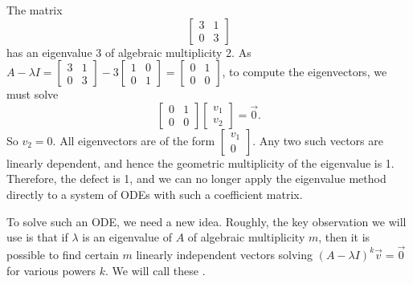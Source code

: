 \begin{example}
The matrix
\begin{equation*}
\begin{bmatrix}
3 & 1 \\ 0 & 3
\end{bmatrix}
\end{equation*}
has an eigenvalue 3 of algebraic multiplicity 2.
As 
$A-\lambda I = \left[ \begin{smallmatrix} 3 & 1 \\ 0 & 3 \end{smallmatrix} \right]
- 3
\left[ \begin{smallmatrix} 1 & 0 \\ 0 & 1 \end{smallmatrix} \right]
=
\left[ \begin{smallmatrix} 0 & 1 \\ 0 & 0 \end{smallmatrix} \right]
$, to compute the eigenvectors, we must solve
\begin{equation*}
\begin{bmatrix}
0 & 1 \\ 0 & 0
\end{bmatrix}
\begin{bmatrix}
v_1 \\ v_2
\end{bmatrix}
= \vec{0} .
\end{equation*}
So $v_2 = 0$.  All eigenvectors are of the form
$\left[ \begin{smallmatrix} v_1 \\ 0 \end{smallmatrix} \right]$.  Any two
such vectors are linearly dependent, and hence the geometric multiplicity
of the eigenvalue is 1.  Therefore, the defect is 1, and we can no longer
apply the eigenvalue method directly to a system of ODEs with such a
coefficient matrix.

\medskip

To solve such an ODE\@, we need a new idea.
Roughly, the key observation we will use is that
if $\lambda$ is an eigenvalue of $A$ of algebraic multiplicity $m$,
then it is possible to find certain $m$ linearly independent vectors
solving ${(A-\lambda I)}^k \vec{v} = \vec{0}$ for various powers
$k$.  We will call these \emph{}.

\medskip


\end{example}
